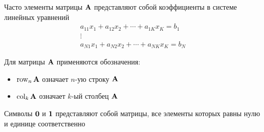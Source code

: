 \begin{frame}

    \vspace{2em}
    Часто элементы матрицы $\mathbf A$ представляют собой коэффициенты 
    в системе линейных уравнений
    \begin{equation*}
        \label{eq:sleq}
        \begin{array}{c}
            a_{11} x_1 + a_{12} x_2 + \cdots + a_{1K} x_K = b_1 \\
            \vdots  \\
            a_{N1} x_1 + a_{N2} x_2 + \cdots + a_{NK} x_K = b_N 
        \end{array}
    \end{equation*}
    
\end{frame}

\begin{frame}

    \vspace{2em}
    Для матрицы $\mathbf A$ применяются обозначения:
    \begin{itemize}
        \item $\operatorname{row}_n \mathbf A$ означает
    $n$-ую строку $\mathbf A$
        \item $\operatorname{col}_k \mathbf A$ означает $k$-ый столбец $\mathbf A$
    \end{itemize} 
    
    \vspace{.7em}
    Символы ${\mathbf 0}$ и ${\mathbf 1}$ представляют собой матрицы, 
    все элементы которых равны нулю и единице соответственно
    
\end{frame}

